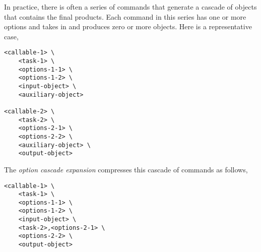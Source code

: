 In practice, there is often a series of commands that generate a cascade of objects that contains the final products. Each command in this series has one or more options and takes in and produces zero or more objects. Here is a representative case,
%
\begin{verbatim}
<callable-1> \
    <task-1> \
    <options-1-1> \
    <options-1-2> \
    <input-object> \
    <auxiliary-object>

<callable-2> \
    <task-2> \
    <options-2-1> \
    <options-2-2> \
    <auxiliary-object> \
    <output-object>
\end{verbatim}
%
The \emph{option cascade expansion} compresses this cascade of commands as follows,
%
\begin{verbatim}
<callable-1> \
    <task-1> \
    <options-1-1> \
    <options-1-2> \
    <input-object> \
    <task-2>,<options-2-1> \
    <options-2-2> \
    <output-object>
\end{verbatim}